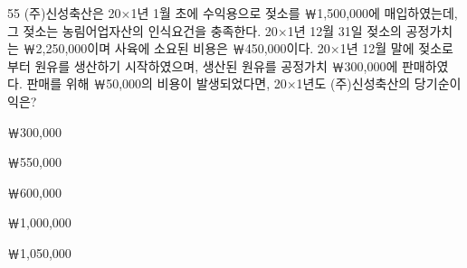 \begin{question}{55}
(주)신성축산은 20×1년 1월 초에 수익용으로 젖소를 ￦1,500,000에 매입하였는데, 그 젖소는 농림어업자산의 인식요건을 충족한다. 20×1년 12월 31일 젖소의 공정가치는 ￦2,250,000이며 사육에 소요된 비용은 ￦450,000이다. 20×1년 12월 말에 젖소로부터 원유를 생산하기 시작하였으며, 생산된 원유를 공정가치 ￦300,000에 판매하였다. 판매를 위해 ￦50,000의 비용이 발생되었다면, 20×1년도 (주)신성축산의 당기순이익은?
\begin{choices}
  \item ￦300,000
  \item ￦550,000
  \item ￦600,000
  \item ￦1,000,000
  \item ￦1,050,000
\end{choices}
\end{question}
